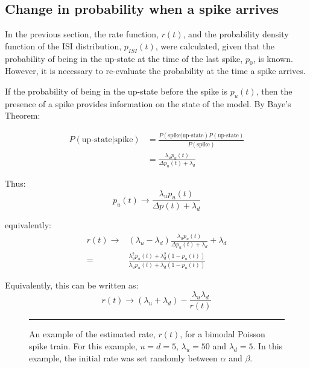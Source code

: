 \subsection{Change in probability when a spike arrives}

In the previous section, the rate function, $r(t)$, and the probability density function of the ISI distribution, $p_{ISI}(t)$, were calculated, given that the probability of being in the up-state at the time of the last spike, $p_0$, is known.  However, it is necessary to re-evaluate the probability at the time a spike arrives.

If the probability of being in the up-state before the spike is $p_u(t)$, then the presence of a spike provides information on the state of the model. By Baye's Theorem:

\begin{equation}
\begin{split}
P(\mbox{up-state} | \mbox{spike}) &= \frac{P(\mbox{spike}|\mbox{up-state})P(\mbox{up-state})}{P(\mbox{spike})} \\
&=\frac{\lambda_u p_u(t)}{\Delta p_u(t) + \lambda_d }
\end{split}
\end{equation}

Thus:
\begin{equation}
p_u(t) \rightarrow \frac{\lambda_u p_u(t)}{\Delta p(t) + \lambda_d}
\end{equation}

equivalently:
\begin{equation}
\begin{split}
r(t) \rightarrow &(\lambda_u - \lambda_d)\frac{\lambda_u p_u(t)}{\Delta p_u(t)+ \lambda_d} + \lambda_d\\
= & \frac{\lambda_u^2 p_u(t) + \lambda_d^2(1-p_u(t))}{\lambda_up_u(t) + \lambda_d(1-p_u(t))}
\end{split}
\end{equation}

Equivalently, this can be written as:
\begin{equation}
r(t) \rightarrow (\lambda_u +\lambda_d) - \frac{\lambda_u\lambda_d}{r(t)}
\end{equation}

\begin{figure}[htb]

\bigskip
\rule{33em}{0.5pt}
\caption{An example of the estimated rate, $r(t)$, for a bimodal Poisson spike train.  For this example, $u=d=5$, $\lambda_u=50$ and $\lambda_d=5$.  In this example, the initial rate was set randomly between $\alpha$ and $\beta$.}
\end{figure}

